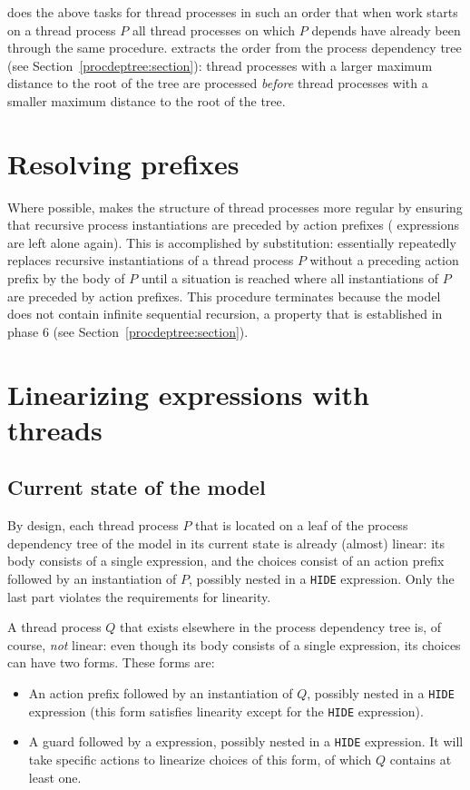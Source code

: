 \lpeq{} does the above tasks for thread processes in such an order that when work starts on a thread process $P$ all thread processes on which $P$ depends have already been through the same procedure.
\lpeq{} extracts the order from the process dependency tree (see Section~\ref{procdeptree:section}): thread processes with a larger maximum distance to the root of the tree are processed \emph{before} thread processes with a smaller maximum distance to the root of the tree.

\section{Resolving prefixes} \label{prefix-resolution:section}

Where possible, \lpeq{} makes the structure of thread processes more regular by ensuring that recursive process instantiations are preceded by action prefixes (\pedi{} expressions are left alone again).
This is accomplished by substitution: \lpeq{} essentially repeatedly replaces recursive instantiations of a thread process $P$ without a preceding action prefix by the body of $P$ until a situation is reached where all instantiations of $P$ are preceded by action prefixes.
This procedure terminates because the model does not contain infinite sequential recursion, a property that is established in phase 6 (see Section~\ref{procdeptree:section}).

\clearpage
\section{Linearizing expressions with threads}

\subsection{Current state of the model}

By design, each thread process $P$ that is located on a leaf of the process dependency tree of the model in its current state is already (almost) linear: its body consists of a single \choice{} expression, and the choices consist of an action prefix followed by an instantiation of $P$, possibly nested in a \texttt{HIDE} expression.
Only the last part violates the requirements for linearity.

A thread process $Q$ that exists elsewhere in the process dependency tree is, of course, \emph{not} linear: even though its body consists of a single \choice{} expression, its choices can have two forms.
These forms are:
\begin{itemize}
\item An action prefix followed by an instantiation of $Q$, possibly nested in a \texttt{HIDE} expression (this form satisfies linearity except for the \texttt{HIDE} expression).
\item A guard followed by a \pedi{} expression, possibly nested in a \texttt{HIDE} expression.
It will take specific actions to linearize choices of this form, of which $Q$ contains at least one.
\end{itemize}

